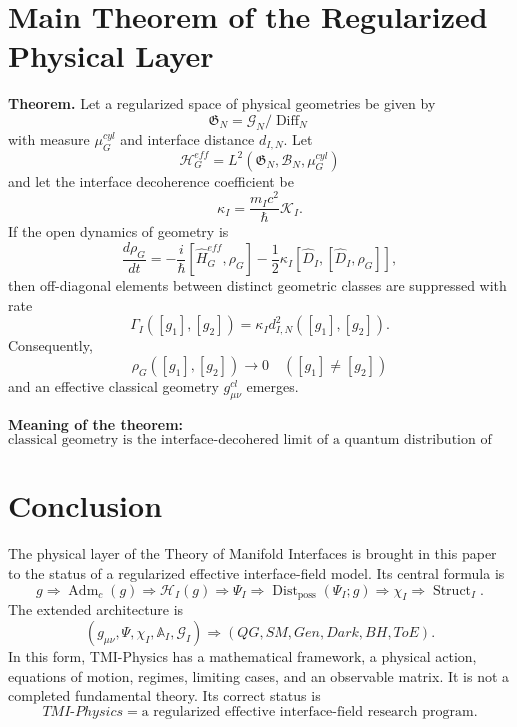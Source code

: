 \documentclass[12pt,a4paper]{article}
\DeclareMathOperator{\Adm}{Adm}
\DeclareMathOperator{\Struct}{Struct}
\DeclareMathOperator{\Dist}{Dist}
\DeclareMathOperator{\Diff}{Diff}
\newcommand{\Hilb}{\mathcal H}
\newcommand{\Acal}{\mathbb A_I}
\newcommand{\gfrak}{\mathfrak G}
\begin{document}
\section{Main Theorem of the Regularized Physical Layer}
\textbf{Theorem.} Let a regularized space of physical geometries be given by
\[
\boxed{\gfrak_N=\mathcal G_N/\Diff_N}
\]
with measure $\mu_G^{cyl}$ and interface distance $d_{I,N}$. Let
\[
\boxed{\Hilb_G^{eff}=L^2(\gfrak_N,\mathcal B_N,\mu_G^{cyl})}
\]
and let the interface decoherence coefficient be
\[
\boxed{\kappa_I=\frac{m_Ic^2}{\hbar}\mathcal K_I.}
\]
If the open dynamics of geometry is
\[
\boxed{
\frac{d\rho_G}{dt}=-\frac{i}{\hbar}[\widehat H_G^{eff},\rho_G]
-\frac12\kappa_I[\widehat D_I,[\widehat D_I,\rho_G]],
}
\]
then off-diagonal elements between distinct geometric classes are suppressed with rate
\[
\boxed{\Gamma_I([g_1],[g_2])=\kappa_Id_{I,N}^2([g_1],[g_2]).}
\]
Consequently,
\[
\boxed{\rho_G([g_1],[g_2])\to0\quad([g_1]\ne[g_2])}
\]
and an effective classical geometry $g_{\mu\nu}^{cl}$ emerges.

\textbf{Meaning of the theorem:}
\[
\boxed{\text{classical geometry is the interface-decohered limit of a quantum distribution of geometries.}}
\]

\section{Conclusion}
The physical layer of the Theory of Manifold Interfaces is brought in this paper to the status of a regularized effective interface-field model. Its central formula is
\[
\boxed{
 g\Rightarrow\Adm_c(g)\Rightarrow\Hilb_I(g)\Rightarrow\Psi_I
 \Rightarrow\Dist_{\mathrm{poss}}(\Psi_I;g)\Rightarrow\chi_I\Rightarrow\Struct_I.
}
\]
The extended architecture is
\[
\boxed{(g_{\mu\nu},\Psi,\chi_I,\Acal,\mathcal G_I)
\Rightarrow(QG,SM,Gen,Dark,BH,ToE).}
\]
In this form, TMI-Physics has a mathematical framework, a physical action, equations of motion, regimes, limiting cases, and an observable matrix. It is not a completed fundamental theory. Its correct status is
\[
\boxed{TMI\text{-}Physics=\text{a regularized effective interface-field research program}.}
\]

\appendix
\end{document}
